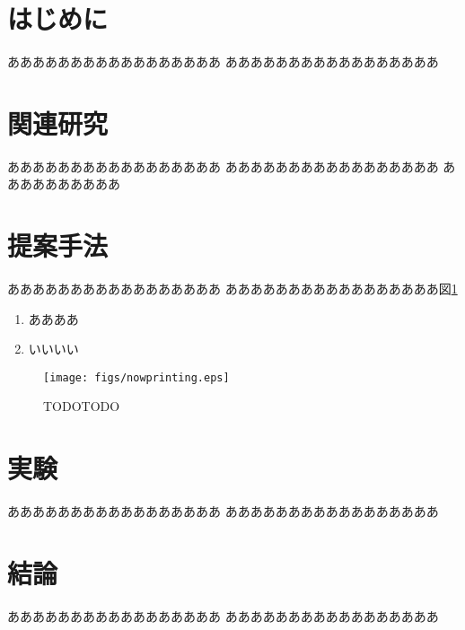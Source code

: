 \documentclass[twocolumn]{jarticle}
\title{
\jtitle{人工知能学会テンプレート}
\etitle{jsai report template}
}
\author{%
\jname{東大太郎\first}
\ename{Taro TODAI}
\and
\jname{第2筆者氏名\second}
\ename{Second Author's Name}
}
\newcommand{\figref}[1]{図\ref{#1}}
\begin{document}
\maketitle

\section{はじめに}
あああああああああああああああああ
あああああああああああああああああ

\section{関連研究}
あああああああああああああああああ
あああああああああああああああああ
ああああああああああ\cite{imagenet}

\section{提案手法}
あああああああああああああああああ
あああああああああああああああああ\figref{fig:apc} 

\begin{enumerate}
  \item ああああ
  \item いいいい
\end{enumerate} 

\begin{figure}[tbh]
  \centering
  \texttt{[image: figs/nowprinting.eps]}
  \caption{TODOTODO}
  \label{fig:apc}
\end{figure}

\section{実験}
あああああああああああああああああ
あああああああああああああああああ

\section{結論}
あああああああああああああああああ
あああああああああああああああああ




\end{document}
